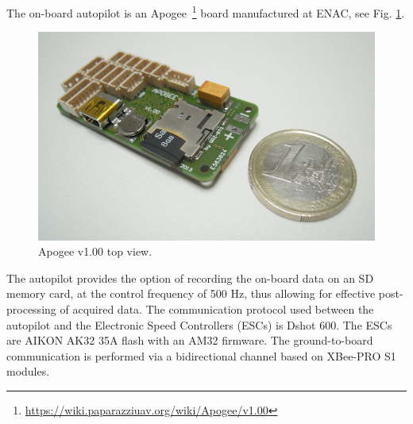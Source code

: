 The on-board autopilot is an Apogee~\footnote{\url{https://wiki.paparazziuav.org/wiki/Apogee/v1.00}} 
board manufactured at ENAC, see Fig. \ref{fig:apogee}. 
\begin{figure}[ht]
\centering
    \includegraphics[width=0.8\columnwidth]{figures/800px-Apogee_v100_top_1E.jpeg}
    \caption{Apogee v1.00 top view.}
    \label{fig:apogee}
\end{figure}
The autopilot provides the option of recording the on-board data on an SD memory card, at the control
 frequency of 500 Hz, thus allowing for effective post-processing of acquired data. 
 The communication protocol used between the autopilot and the Electronic Speed Controllers (ESCs)
  is Dshot 600. The ESCs are AIKON AK32 35A flash with an AM32 firmware. The ground-to-board
   communication is performed via a bidirectional channel based on XBee-PRO S1 modules.
